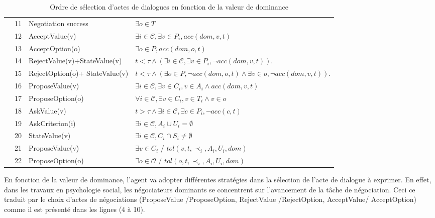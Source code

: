 \begin{table}[!t]
\begin{tabular}{|p{.5cm}|p{.9cm}|p{3.6cm}|p{7.6cm}|}
			\parbox[t]{2mm}{
				} & 11& Negotiation success &  $\exists o \in T$ \\
			&12& AcceptValue(v) & $\exists i\in\mathcal{C}, \exists v \in P_i, acc(dom, v, t)$ \\
			&13&AcceptOption(o) & $\exists o \in P, acc(dom, o, t)$ \\
			&14&RejectValue(v)+\newline StateValue(v) & $ t<\tau \land (\exists i\in\mathcal{C}, \exists v \in P_i, \neg acc(dom,v, t))$.\\
			&15&RejectOption(o)+ \newline StateValue(v) & $ t<\tau \land (\exists o \in P,  \neg acc(dom,o, t) \land \exists v \in o, \neg acc(dom,v, t))$.\\
			&16&ProposeValue(v) &  $\exists i\in\mathcal{C}, \exists v \in C_i, v \in A_i  \land acc(dom, v, t) $\\
			&17&ProposeOption(o)  & $\forall i\in\mathcal{C},\exists v \in C_i, v \in T_i  \land v \in o$ \\
			&18&AskValue(v) & $t > \tau \land \exists i\in\mathcal{C}, \exists c \in P_i, \neg acc(c, t)$ \\
			&19&AskCriterion(i) & $\exists i\in\mathcal{C}, A_i \cup U_i= \emptyset $\\
			&20&StateValue(v) & $\exists i\in\mathcal{C}, C_i\cap S_i \neq \emptyset$	\\
			&21& ProposeValue(v) & $\exists v \in C_i$ / $tol(v, t, \prec_i, A_i, U_i, dom)$\\
			&22& ProposeOption(o) & $\exists o \in \mathcal{O}$ / $tol(o, t, \prec_i, A_i, U_i, dom)$\\
			
			\hline
		\end{tabular}
		
		\caption{Ordre de sélection d'actes de dialogues en fonction de la valeur de dominance}
		\label{table:uttChoice}
	\end{table}
	
	En fonction de la valeur de dominance, l'agent va adopter différentes stratégies dans la sélection de l'acte de dialogue à exprimer. En effet, dans les travaux en psychologie social, les négociateurs dominants se concentrent sur l'avancement de la tâche de négociation. Ceci ce traduit par le choix d'actes de négociations (ProposeValue /ProposeOption, RejectValue /RejectOption, AcceptValue/ AcceptOption) comme il est présenté dans les lignes (4 à 10).
	
